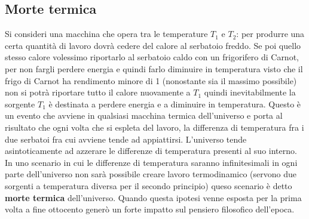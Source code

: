 \documentclass[10pt,a4paper]{article}
\begin{document}
\subsection{Morte termica}
Si consideri una macchina che opera tra le temperature \(T_1\) e \(T_2\): per produrre una certa quantità di lavoro dovrà cedere del calore al serbatoio freddo. Se poi quello stesso calore volessimo riportarlo al serbatoio caldo con un frigorifero di Carnot, per non fargli perdere energia e quindi farlo diminuire in temperatura visto che il frigo di Carnot ha rendimento minore di 1 (nonostante sia il massimo possibile) non si potrà riportare tutto il calore nuovamente a \(T_1\) quindi inevitabilmente la sorgente \(T_1\) è destinata a perdere energia e a diminuire in temperatura. Questo è un evento che avviene in qualsiasi macchina termica dell'universo e porta al risultato che ogni volta che si espleta del lavoro, la differenza di temperatura fra i due serbatoi fra cui avviene tende ad appiattirsi. L'universo tende asintoticamente ad azzerare le differenze di temperatura presenti al suo interno. In uno scenario in cui le differenze di temperatura saranno infinitesimali in ogni parte dell'universo non sarà possibile creare lavoro termodinamico (servono due sorgenti a temperatura diversa per il secondo principio) queso scenario è detto \textbf{morte termica} dell'universo. Quando questa ipotesi venne esposta per la prima volta a fine ottocento generò un forte impatto sul pensiero filosofico dell'epoca. 
\appendix
\end{document}
